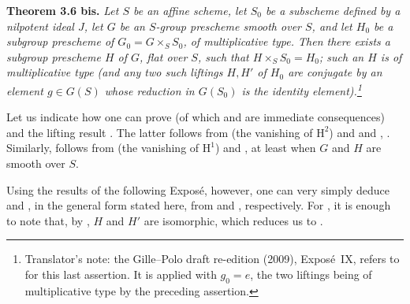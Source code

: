 \medskip
\noindent{}\textbf{Theorem 3.6 bis.}
\textit{Let \(S\) be an affine scheme, let \(S_0\) be a subscheme defined
by a nilpotent ideal \(J\), let \(G\) be an \(S\)-group prescheme smooth
over \(S\), and let \(H_0\) be a subgroup prescheme of
\(G_0=G\times_SS_0\), of multiplicative type. Then there exists a
subgroup prescheme \(H\) of \(G\), flat over \(S\), such that
\(H\times_SS_0=H_0\); such an \(H\) is of multiplicative type (and any
two such liftings \(H,H'\) of \(H_0\) are conjugate by an element
\(g\in G(S)\) whose reduction in \(G(S_0)\) is the identity element).\footnote{Translator's note: the Gille--Polo draft re-edition (2009), Expos\'e~IX, refers to  for this last assertion. It is  applied with \(g_0=e\), the two liftings being of multiplicative type by the preceding assertion.}}

Let us indicate how one can prove
 (of which
 and
 are immediate
consequences) and the lifting result
. The latter follows from
 (the vanishing of
\(\mathrm H^2\)) and  and , . Similarly,
 follows from
 (the vanishing of
\(\mathrm H^1\)) and , at least when \(G\) and \(H\) are
smooth over \(S\).

Using the results of the following Expos\'e, however, one can very simply
deduce  and
, in the general form stated
here, from  and
, respectively. For
, it is enough to note that,
by , \(H\) and \(H'\) are isomorphic, which reduces us to
.

